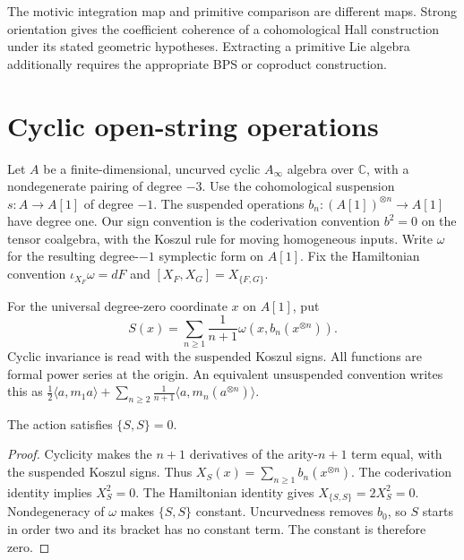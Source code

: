 The motivic integration map and primitive comparison are different maps.
Strong orientation gives the coefficient coherence of a cohomological
Hall construction under its stated geometric hypotheses.
Extracting a primitive Lie algebra additionally requires the appropriate
BPS or coproduct construction.

\chapter{Cyclic open-string operations}
Let $A$ be a finite-dimensional, uncurved cyclic $A_\infty$ algebra
over $\mathbb C$, with a nondegenerate pairing of degree $-3$.
Use the cohomological suspension $s:A\to A[1]$ of degree $-1$.
The suspended operations $b_n:(A[1])^{\otimes n}\to A[1]$ have degree one.
Our sign convention is the coderivation convention $b^2=0$ on the
tensor coalgebra, with the Koszul rule for moving homogeneous inputs.
Write $\omega$ for the resulting degree-$-1$ symplectic form on $A[1]$.
Fix the Hamiltonian convention $\iota_{X_F}\omega=dF$ and
$[X_F,X_G]=X_{\{F,G\}}$.

For the universal degree-zero coordinate $x$ on $A[1]$, put
\[
 S(x)=\sum_{n\ge1}\frac1{n+1}\omega(x,b_n(x^{\otimes n})).
\]
Cyclic invariance is read with the suspended Koszul signs.
All functions are formal power series at the origin.
An equivalent unsuspended convention writes this as
$\frac12\langle a,m_1a\rangle+
\sum_{n\ge2}\frac1{n+1}\langle a,m_n(a^{\otimes n})\rangle$.

\begin{proposition}\label{cyiv:cyclic-master}
The action satisfies $\{S,S\}=0$.
\end{proposition}
\begin{proof}
Cyclicity makes the $n+1$ derivatives of the arity-$n+1$ term equal,
with the suspended Koszul signs.
Thus $X_S(x)=\sum_{n\ge1}b_n(x^{\otimes n})$.
The coderivation identity implies $X_S^2=0$.
The Hamiltonian identity gives $X_{\{S,S\}}=2X_S^2=0$.
Nondegeneracy of $\omega$ makes $\{S,S\}$ constant.
Uncurvedness removes $b_0$, so $S$ starts in order two and its bracket
has no constant term.
The constant is therefore zero.
\end{proof}

